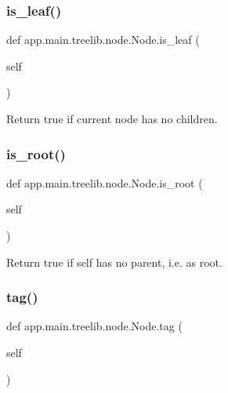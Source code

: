 \subsubsection{\texorpdfstring{is\+\_\+leaf()}{is\_leaf()}}
{\footnotesize\ttfamily def app.\+main.\+treelib.\+node.\+Node.\+is\+\_\+leaf (\begin{DoxyParamCaption}\item[{}]{self }\end{DoxyParamCaption})}

\begin{DoxyVerb}Return true if current node has no children.\end{DoxyVerb}
 \mbox{\label{classapp_1_1main_1_1treelib_1_1node_1_1Node_a3e70bbc4a3f2e1642546769b4bc82949}} 
\subsubsection{\texorpdfstring{is\+\_\+root()}{is\_root()}}
{\footnotesize\ttfamily def app.\+main.\+treelib.\+node.\+Node.\+is\+\_\+root (\begin{DoxyParamCaption}\item[{}]{self }\end{DoxyParamCaption})}

\begin{DoxyVerb}Return true if self has no parent, i.e. as root.\end{DoxyVerb}
 \mbox{\label{classapp_1_1main_1_1treelib_1_1node_1_1Node_a5ddde76bda1e158e64eab1dc17712af6}} 
\subsubsection{\texorpdfstring{tag()}{tag()}\hspace{0.1cm}{\footnotesize\ttfamily [1/2]}}
{\footnotesize\ttfamily def app.\+main.\+treelib.\+node.\+Node.\+tag (\begin{DoxyParamCaption}\item[{}]{self }\end{DoxyParamCaption})}

